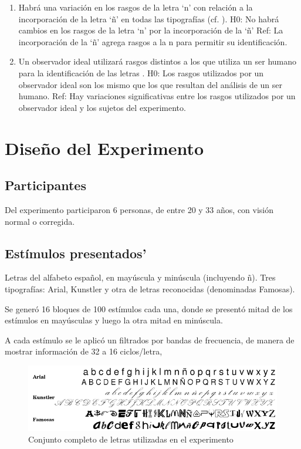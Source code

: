 \documentclass[runningheads,a4paper]{llncs}
\begin{document}
\begin{enumerate}
 \item Habrá una variación en los rasgos de la letra `n' con relación a la incorporación de la letra `ñ' en todas las tipografías (cf. \cite{FisetEtAl08:BubblesForLetters}).
    \subitem H0: No habrá cambios en los rasgos de la letra `n' por la incorporación de la `ñ'
    \subitem Ref: La incorporación de la `ñ' agrega rasgos a la n para permitir su identificación.
 \item Un observador ideal utilizará rasgos distintos a los que utiliza un ser humano para la identificación de las letras \cite{PelliEtAl06:LetterIdentification}.
    \subitem H0: Los rasgos utilizados por un observador ideal son los mismo que los que resultan del análisis de un ser humano.
    \subitem Ref: Hay variaciones significativas entre los rasgos utilizados por un observador ideal y los sujetos del experimento.
\end{enumerate}


\section{Dise\~no del Experimento}
\label{sec:DisenoExperimento}

\subsection{Participantes}

Del experimento participaron 6 personas, de entre 20 y 33 años, con visión normal o corregida.

\subsection{Est\'imulos presentados'}
Letras del alfabeto español, en mayúscula y minúscula (incluyendo ñ).
Tres tipografías: Arial, Kunstler y otra de letras reconocidas (denominadas Famosas).

Se generó 16 bloques de 100 estímulos cada una, donde se presentó mitad de los estímulos en mayúsculas y luego la otra mitad en minúscula.

A cada estímulo se le aplicó un filtrados por bandas de frecuencia, de manera de mostrar información de 32 a 16 ciclos/letra,

\begin{figure}
 \includegraphics[scale=0.60]{graficos/letras.png}
  \caption{Conjunto completo de letras utilizadas en el experimento}
  \label{figura:conjuntoLetras}
\end{figure}
\end{document}

